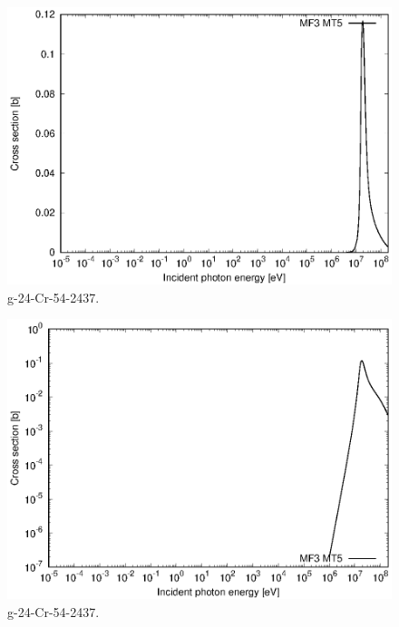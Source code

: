 \begin{figure}
 \includegraphics[width=\linewidth]{eps/g_24-Cr-54_2437.eps}
  \caption{g-24-Cr-54-2437.}
\end{figure}
\begin{figure}
 \includegraphics[width=\linewidth]{eps-log/g_24-Cr-54_2437.eps}
 \caption{g-24-Cr-54-2437.}
\end{figure}
\newpage \clearpage

